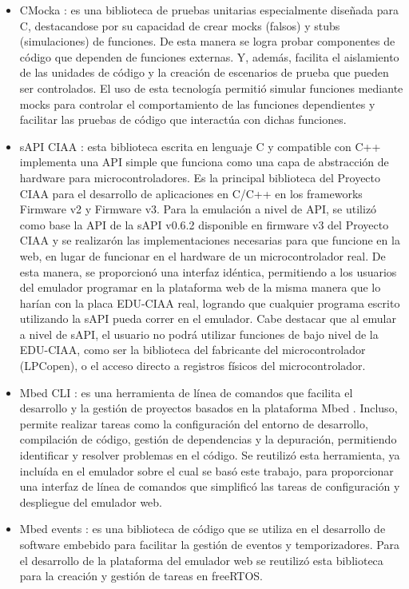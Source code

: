 \begin{itemize}
    \item CMocka \citep{CMocka}: es una biblioteca de pruebas unitarias especialmente diseñada para C, destacandose por su capacidad de crear mocks (falsos) y stubs (simulaciones) de funciones. De esta manera se logra probar componentes de código que dependen de funciones externas. Y, además, facilita el aislamiento de las unidades de código y la creación de escenarios de prueba que pueden ser controlados. El uso de esta tecnología permitió simular funciones mediante mocks para controlar el comportamiento de las funciones dependientes y facilitar las pruebas de código que interactúa con dichas funciones.
    
    \item sAPI CIAA \citep{sAPICIAA}: esta biblioteca escrita en lenguaje C y compatible con C++ implementa una API simple que funciona como una capa de abstracción de hardware para microcontroladores. Es la principal biblioteca del Proyecto CIAA para el desarrollo de aplicaciones en C/C++ en los frameworks Firmware v2\citep{firmwareV2} y Firmware v3\citep{firmwareV3}. 
Para la emulación a nivel de API, se utilizó como base la API de la sAPI v0.6.2 disponible en firmware v3 del Proyecto CIAA \citep{sAPIv0.6.2} y se realizarón las implementaciones necesarias para que funcione en la web, en lugar de funcionar en el hardware de un microcontrolador real.
De esta manera, se proporcionó una interfaz idéntica, permitiendo a los usuarios del emulador programar en la plataforma web de la misma manera que lo harían con la placa EDU-CIAA real, logrando que cualquier programa escrito utilizando la sAPI pueda correr en el emulador.
Cabe destacar que al emular a nivel de sAPI, el usuario no podrá utilizar funciones de bajo nivel de la EDU-CIAA, como ser la biblioteca del fabricante del microcontrolador (LPCopen\citep{lpcopen}), o el acceso directo a registros físicos del microcontrolador.
    
    \item Mbed CLI \citep{MbedCLI}: es una herramienta de línea de comandos que facilita el desarrollo y la gestión de proyectos basados en la plataforma Mbed \citep{ArmMbed}. Incluso, permite realizar tareas como la configuración del entorno de desarrollo, compilación de código, gestión de dependencias y la depuración, permitiendo identificar y resolver problemas en el código. Se reutilizó esta herramienta, ya incluída en el emulador sobre el cual se basó este trabajo, para proporcionar una interfaz de línea de comandos que simplificó las tareas de configuración y despliegue del emulador web.
 
    
     \item Mbed events \citep{ArmMbed}: es una biblioteca de código que se utiliza en el desarrollo de software embebido para facilitar la gestión de eventos y temporizadores. Para el desarrollo de la plataforma del emulador web se reutilizó esta biblioteca para la creación y gestión de tareas en freeRTOS.
     
\end{itemize}


